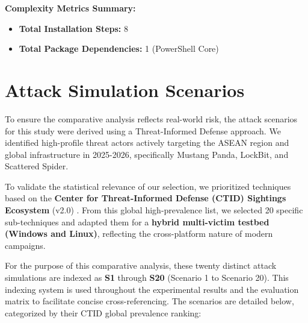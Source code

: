 \vspace{1em}
\noindent \textbf{Complexity Metrics Summary:}
\begin{itemize}
    \item \textbf{Total Installation Steps:} 8
    \item \textbf{Total Package Dependencies:} 1 (PowerShell Core)
\end{itemize}


\section{Attack Simulation Scenarios}\label{sec:AttackScenarios}
To ensure the comparative analysis reflects real-world risk, the attack scenarios for this study were derived using a Threat-Informed Defense approach. We identified high-profile threat actors actively targeting the ASEAN region and global infrastructure in 2025-2026, specifically Mustang Panda\cite{mitre_c0047}\cite{thaicert_mustang}, LockBit\cite{mitre_lockbit}, and Scattered Spider\cite{mitre_c0027}.

To validate the statistical relevance of our selection, we prioritized techniques based on the \textbf{Center for Threat-Informed Defense (CTID) Sightings Ecosystem} (v2.0) \cite{ctid_sightings}. From this global high-prevalence list, we selected 20 specific sub-techniques and adapted them for a \textbf{hybrid multi-victim testbed (Windows and Linux)}, reflecting the cross-platform nature of modern campaigns.

For the purpose of this comparative analysis, these twenty distinct attack simulations are indexed as \textbf{S1} through \textbf{S20} (Scenario 1 to Scenario 20). This indexing system is used throughout the experimental results and the evaluation matrix to facilitate concise cross-referencing. The scenarios are detailed below, categorized by their CTID global prevalence ranking:

